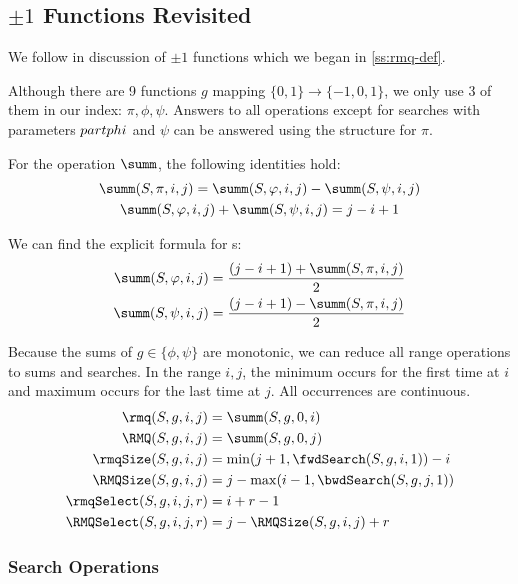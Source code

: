 \subsection{$\pm 1$ Functions Revisited}

We follow in discussion of $\pm 1$ functions which we began in \ref{ss:rmq-def}.

Although there are 9 functions $g$ mapping $\{0, 1\} \to \{-1, 0, 1\}$, we only use 3 of them in our index: $\pi, \phi, \psi$.
Answers to all operations except for searches with parameters $\\part{phi}$ and $\psi$ can be answered using the structure for $\pi$.

For the operation $\summ$, the following identities hold:
\begin{gather*}
	\summ(S, \pi, i, j) = \summ(S, \phi, i, j) - \summ(S, \psi, i, j) \\
	\summ(S, \phi, i, j) + \summ(S, \psi, i, j) = j - i + 1
\end{gather*}

We can find the explicit formula for \summ{}s:
\begin{align*}
	\summ(S, \phi, i, j) &= \frac{(j - i + 1) + \summ(S, \pi, i, j)}{2} \\
	\summ(S, \psi, i, j) &= \frac{(j - i + 1) - \summ(S, \pi, i, j)}{2}
\end{align*}

Because the sums of $g \in \{\phi, \psi \}$ are monotonic, we can reduce all range operations to sums and searches.
In the range $i, j$, the minimum occurs for the first time at $i$ and maximum occurs for the last time at $j$.
All occurrences are continuous.
\begin{align*}
	\rmq(S, g, i, j) &= \summ(S, g, 0, i) \\
	\RMQ(S, g, i, j) &= \summ(S, g, 0, j) \\
	\rmqSize(S, g, i, j) &= \min(j + 1, \fwdSearch(S, g, i, 1)) - i \\
	\RMQSize(S, g, i, j) &= j - \max(i - 1, \bwdSearch(S, g, j, 1)) \\
	\rmqSelect(S, g, i, j, r) &= i + r - 1 \\ 
	\RMQSelect(S, g, i, j, r) &= j - \RMQSize(S, g, i, j) + r
\end{align*}

\subsubsection{Search Operations}

